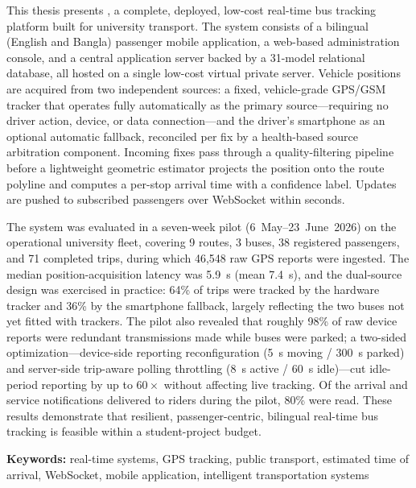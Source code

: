 This thesis presents \emph{\system{}}, a complete, deployed, low-cost
real-time bus tracking platform built for university transport. The system
consists of a bilingual (English and Bangla) passenger mobile application,
a web-based administration console, and a central application server
backed by a 31-model relational database, all hosted on a single low-cost
virtual private server. Vehicle positions are acquired from two
independent sources: a fixed, vehicle-grade GPS/GSM tracker that operates
fully automatically as the primary source---requiring no driver action,
device, or data connection---and the driver's smartphone as an optional
automatic fallback, reconciled per fix by a health-based source
arbitration component. Incoming fixes pass through a quality-filtering
pipeline before a lightweight geometric estimator projects the position
onto the route polyline and computes a per-stop arrival time with a
confidence label. Updates are pushed to subscribed passengers over
WebSocket within seconds.

The system was evaluated in a seven-week pilot (6~May--23~June~2026) on
the operational university fleet, covering 9 routes, 3 buses, 38
registered passengers, and 71 completed trips, during which 46{,}548 raw
GPS reports were ingested. The median position-acquisition latency was
5.9~s (mean 7.4~s), and the dual-source design was exercised in practice:
64\% of trips were tracked by the hardware tracker and 36\% by the
smartphone fallback, largely reflecting the two buses not yet fitted with
trackers. The pilot also revealed that roughly 98\% of raw device reports
were redundant transmissions made while buses were parked; a two-sided
optimization---device-side reporting reconfiguration (5~s moving / 300~s
parked) and server-side trip-aware polling throttling (8~s active / 60~s
idle)---cut idle-period reporting by up to $60\times$ without affecting
live tracking. Of the arrival and service notifications delivered to
riders during the pilot, 80\% were read. These results demonstrate that
resilient, passenger-centric, bilingual real-time bus tracking is feasible
within a student-project budget.

\vspace{0.5cm}
\noindent\textbf{Keywords:} real-time systems, GPS tracking, public
transport, estimated time of arrival, WebSocket, mobile application,
intelligent transportation systems
\clearpage
